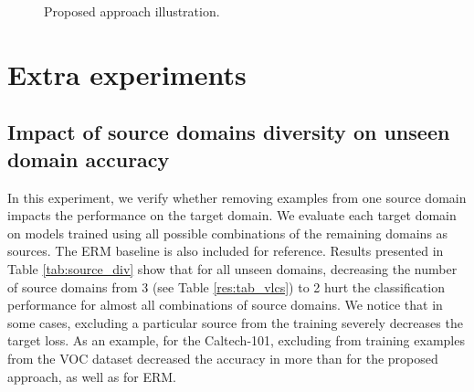 \documentclass{article}
\begin{document}
\begin{figure}[h]
{
}
\caption{Proposed approach illustration.}
\label{fig:method}
\end{figure}

\section{Extra experiments}
\subsection{Impact of source domains diversity on unseen domain accuracy}
In this experiment, we verify whether removing examples from one source domain impacts the performance on the target domain. We evaluate each target domain on models trained using all possible combinations of the remaining domains as sources. The ERM baseline is also included for reference. Results presented in Table \ref{tab:source_div} show that for all unseen domains, decreasing the number of source domains from 3 (see Table \ref{res:tab_vlcs}) to 2 hurt the classification performance for almost all combinations of source domains. We notice that in some cases, excluding a particular source from the training severely decreases the target loss. As an example, for the Caltech-101, excluding from training examples from the VOC dataset decreased the accuracy in more than  for the proposed approach, as well as for ERM.    
\end{document}
